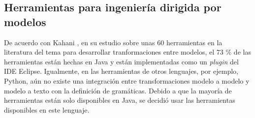 \subsection{Herramientas para ingeniería dirigida por modelos}
De acuerdo con Kahani \cite{kahani_survey_2019}, en su estudio sobre unas 60 herramientas en la literatura del tema para desarrollar tranformaciones entre modelos, el 73 \% de las herramientas están hechas en Java\cite{joy_java_2000} y están implementadas como un \textit{plugin} del IDE Eclipse\cite{eclipse_eclipse_2009}. Igualmente, en las herramientas de otros lenguajes, por ejemplo, Python, aún no existe una integración entre transformaciones modelo a modelo y modelo a texto con la definición de gramáticas. Debido a que la mayoría de herramientas están solo disponibles en Java, se decidió usar las herramientas disponibles en este lenguaje.




